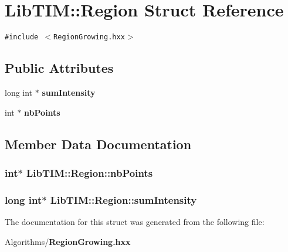 \section{Lib\-TIM::Region Struct Reference}
\label{structLibTIM_1_1Region}
{\tt \#include $<$Region\-Growing.hxx$>$}

\subsection*{Public Attributes}
\begin{CompactItemize}
\item 
long int $\ast$ {\bf sum\-Intensity}
\item 
int $\ast$ {\bf nb\-Points}
\end{CompactItemize}


\subsection{Member Data Documentation}
\subsubsection{\setlength{\rightskip}{0pt plus 5cm}int$\ast$ {\bf Lib\-TIM::Region::nb\-Points}}\label{structLibTIM_1_1Region_o1}


\subsubsection{\setlength{\rightskip}{0pt plus 5cm}long int$\ast$ {\bf Lib\-TIM::Region::sum\-Intensity}}\label{structLibTIM_1_1Region_o0}




The documentation for this struct was generated from the following file:\begin{CompactItemize}
\item 
Algorithms/{\bf Region\-Growing.hxx}\end{CompactItemize}
